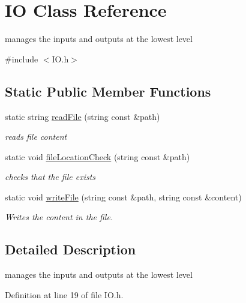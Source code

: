 \hypertarget{classIO}{\section{I\+O Class Reference}
\label{classIO}
}


manages the inputs and outputs at the lowest level  




{\ttfamily \#include $<$I\+O.\+h$>$}

\subsection*{Static Public Member Functions}
\begin{DoxyCompactItemize}
\item 
static string \hyperlink{classIO_a6138448963246f65e08ee2e3c656a75f}{read\+File} (string const \&path)
\begin{DoxyCompactList}\small\item\em reads file content \end{DoxyCompactList}\item 
static void \hyperlink{classIO_a7565597b177de10e822ab266eb284cf1}{file\+Location\+Check} (string const \&path)
\begin{DoxyCompactList}\small\item\em checks that the file exists \end{DoxyCompactList}\item 
static void \hyperlink{classIO_affdd7cd3e9c55cbf32551920e491cae6}{write\+File} (string const \&path, string const \&content)
\begin{DoxyCompactList}\small\item\em Writes the content in the file. \end{DoxyCompactList}\end{DoxyCompactItemize}


\subsection{Detailed Description}
manages the inputs and outputs at the lowest level 

Definition at line 19 of file I\+O.\+h.



